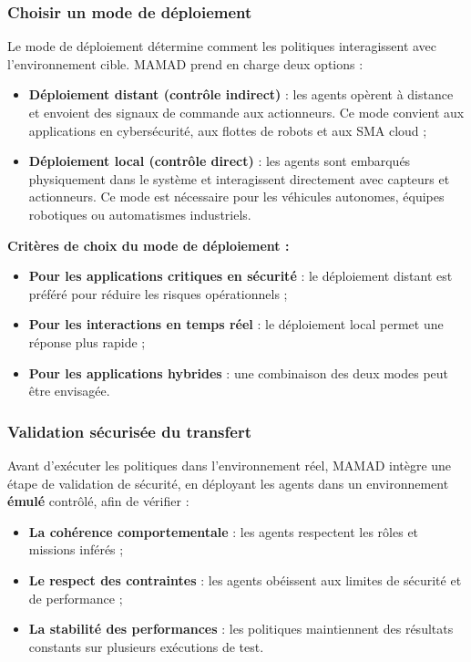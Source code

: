 \documentclass[pdflatex,sn-mathphys-num]{sn-jnl}%
\theoremstyle{thmstyleone}%
\theoremstyle{thmstyletwo}%
\theoremstyle{thmstylethree}%
\begin{document}
\subsubsection{Choisir un mode de déploiement}

Le mode de déploiement détermine comment les politiques interagissent avec l'environnement cible. MAMAD prend en charge deux options :

\begin{itemize}
    \item \textbf{Déploiement distant (contrôle indirect)} : les agents opèrent à distance et envoient des signaux de commande aux actionneurs. Ce mode convient aux applications en cybersécurité, aux flottes de robots et aux SMA cloud ;
          
    \item \textbf{Déploiement local (contrôle direct)} : les agents sont embarqués physiquement dans le système et interagissent directement avec capteurs et actionneurs. Ce mode est nécessaire pour les véhicules autonomes, équipes robotiques ou automatismes industriels.
\end{itemize}

\vspace{0.4em}
\noindent \textbf{Critères de choix du mode de déploiement :}
\begin{itemize}
    \item \textbf{Pour les applications critiques en sécurité} : le déploiement distant est préféré pour réduire les risques opérationnels ;
    \item \textbf{Pour les interactions en temps réel} : le déploiement local permet une réponse plus rapide ;
    \item \textbf{Pour les applications hybrides} : une combinaison des deux modes peut être envisagée.
\end{itemize}

\subsubsection{Validation sécurisée du transfert}

Avant d'exécuter les politiques dans l'environnement réel, MAMAD intègre une étape de validation de sécurité, en déployant les agents dans un environnement \textbf{émulé} contrôlé, afin de vérifier :

\begin{itemize}
    \item \textbf{La cohérence comportementale} : les agents respectent les rôles et missions inférés ;
    \item \textbf{Le respect des contraintes} : les agents obéissent aux limites de sécurité et de performance ;
    \item \textbf{La stabilité des performances} : les politiques maintiennent des résultats constants sur plusieurs exécutions de test.
\end{itemize}
\end{document}
